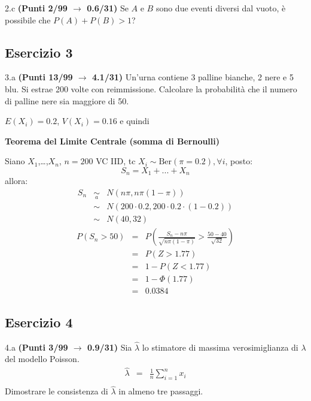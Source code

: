 \documentclass[
  11pt,
]{book}
\theoremstyle{mytheoremstyle}
\theoremstyle{mydefstyle}
\begin{document}
2.c \textbf{(Punti 2/99 \(\rightarrow\) 0.6/31)} Se \(A\) e \(B\) sono due eventi diversi dal vuoto, è possibile che \(P(A)+P(B)>1\)?

\subsection{Esercizio 3}\label{esercizio-3-11}

3.a \textbf{(Punti 13/99 \(\rightarrow\) 4.1/31)} Un'urna contiene 3 palline bianche, 2 nere e 5 blu. Si estrae 200 volte con reimmissione.
Calcolare la probabilità che il numero di palline nere sia maggiore di 50.

\(E(X_i)=0.2\), \(V(X_i)=0.16\) e quindi

\textbf{Teorema del Limite Centrale (somma di Bernoulli)}

Siano \(X_1\),\ldots,\(X_n\), \(n=200\) VC IID, tc \(X_i\sim\text{Ber}(\pi=0.2)\)\(,\forall i\), posto:
\[
      S_n = X_1 + ... + X_n
      \]
allora:\begin{eqnarray*}
  S_n & \mathop{\sim}\limits_{a}& N(n\pi,n\pi(1-\pi)) \\
      &\sim & N(200\cdot0.2,200\cdot0.2\cdot(1-0.2)) \\
      &\sim & N(40,32)
  \end{eqnarray*}\begin{eqnarray*}
      P( S_n   >   50 ) 
        &=& P\left(  \frac { S_n  -  n\pi }{ \sqrt{n\pi(1-\pi)} }  >  \frac { 50  -  40 }{\sqrt{ 32 }} \right)  \\
                 &=& P\left(  Z   >   1.77 \right) \\    &=& 1-P(Z< 1.77 )\\ 
                 &=&  1-\Phi( 1.77 ) \\ &=&  0.0384 
      \end{eqnarray*}

\subsection{Esercizio 4}\label{esercizio-4-11}

4.a \textbf{(Punti 3/99 \(\rightarrow\) 0.9/31)} Sia \(\hat \lambda\) lo stimatore di massima verosimiglianza di \(\lambda\) del modello Poisson.
\begin{eqnarray*}
  \hat\lambda &=&  \frac 1n\sum_{i=1}^nx_i\\
\end{eqnarray*}
Dimostrare le consistenza di \(\hat\lambda\) in almeno tre passaggi.
\end{document}
